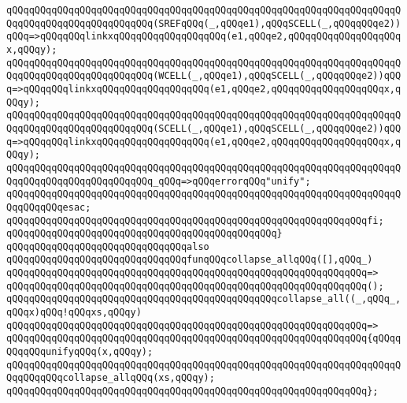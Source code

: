 \verb|qQQqqQQqqQQqqQQqqQQqqQQqqQQqqQQqqQQqqQQqqQQqqQQqqQQqqQQqqQQqqQQqqQQqqQQqqQQqqQQqqQQqqQQqqQQqqQQq(SREFqQQq(_,qQQqe1),qQQqSCELL(_,qQQqqQQqe2))qQQq=>qQQqqQQqlinkxqQQqqQQqqQQqqQQqqQQq(e1,qQQqe2,qQQqqQQqqQQqqQQqqQQqx,qQQqy);|\newline
\verb|qQQqqQQqqQQqqQQqqQQqqQQqqQQqqQQqqQQqqQQqqQQqqQQqqQQqqQQqqQQqqQQqqQQqqQQqqQQqqQQqqQQqqQQqqQQqqQQq(WCELL(_,qQQqe1),qQQqSCELL(_,qQQqqQQqe2))qQQq=>qQQqqQQqlinkxqQQqqQQqqQQqqQQqqQQq(e1,qQQqe2,qQQqqQQqqQQqqQQqqQQqx,qQQqy);|\newline
\verb|qQQqqQQqqQQqqQQqqQQqqQQqqQQqqQQqqQQqqQQqqQQqqQQqqQQqqQQqqQQqqQQqqQQqqQQqqQQqqQQqqQQqqQQqqQQqqQQq(SCELL(_,qQQqe1),qQQqSCELL(_,qQQqqQQqe2))qQQq=>qQQqqQQqlinkxqQQqqQQqqQQqqQQqqQQq(e1,qQQqe2,qQQqqQQqqQQqqQQqqQQqx,qQQqy);|\newline
\newline
\verb|qQQqqQQqqQQqqQQqqQQqqQQqqQQqqQQqqQQqqQQqqQQqqQQqqQQqqQQqqQQqqQQqqQQqqQQqqQQqqQQqqQQqqQQqqQQqqQQq_qQQq=>qQQqerrorqQQq"unify";|\newline
\verb|qQQqqQQqqQQqqQQqqQQqqQQqqQQqqQQqqQQqqQQqqQQqqQQqqQQqqQQqqQQqqQQqqQQqqQQqqQQqqQQqesac;|\newline
\verb|qQQqqQQqqQQqqQQqqQQqqQQqqQQqqQQqqQQqqQQqqQQqqQQqqQQqqQQqqQQqqQQqfi;|\newline
\verb|qQQqqQQqqQQqqQQqqQQqqQQqqQQqqQQqqQQqqQQqqQQqqQQq}|\newline
\newline
\verb|qQQqqQQqqQQqqQQqqQQqqQQqqQQqqQQqalso|\newline
\verb|qQQqqQQqqQQqqQQqqQQqqQQqqQQqqQQqfunqQQqcollapse_allqQQq([],qQQq_)|\newline
\verb|qQQqqQQqqQQqqQQqqQQqqQQqqQQqqQQqqQQqqQQqqQQqqQQqqQQqqQQqqQQqqQQq=>|\newline
\verb|qQQqqQQqqQQqqQQqqQQqqQQqqQQqqQQqqQQqqQQqqQQqqQQqqQQqqQQqqQQqqQQq();|\newline
\newline
\verb|qQQqqQQqqQQqqQQqqQQqqQQqqQQqqQQqqQQqqQQqqQQqqQQqcollapse_all((_,qQQq_,qQQqx)qQQq!qQQqxs,qQQqy)|\newline
\verb|qQQqqQQqqQQqqQQqqQQqqQQqqQQqqQQqqQQqqQQqqQQqqQQqqQQqqQQqqQQqqQQq=>|\newline
\verb|qQQqqQQqqQQqqQQqqQQqqQQqqQQqqQQqqQQqqQQqqQQqqQQqqQQqqQQqqQQqqQQq{qQQqqQQqqQQqunifyqQQq(x,qQQqy);|\newline
\verb|qQQqqQQqqQQqqQQqqQQqqQQqqQQqqQQqqQQqqQQqqQQqqQQqqQQqqQQqqQQqqQQqqQQqqQQqqQQqqQQqcollapse_allqQQq(xs,qQQqy);|\newline
\verb|qQQqqQQqqQQqqQQqqQQqqQQqqQQqqQQqqQQqqQQqqQQqqQQqqQQqqQQqqQQqqQQq};|\newline
